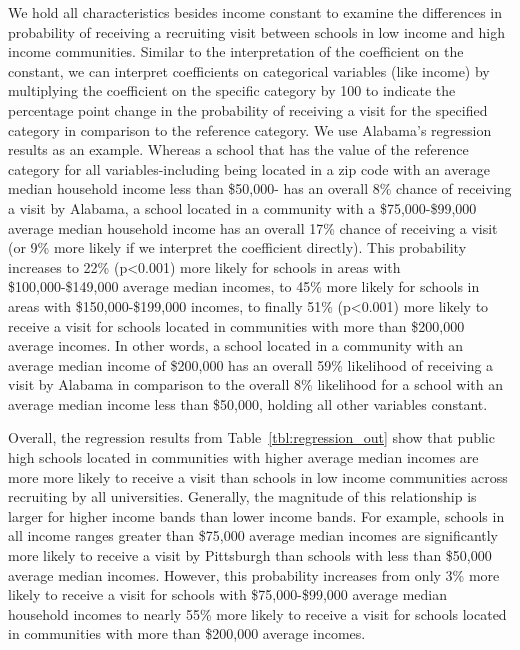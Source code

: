 \documentclass[twoside]{article}
\begin{document}
We hold all characteristics besides income constant to examine the differences in probability of receiving a recruiting visit between schools in low income and high income communities. Similar to the interpretation of the coefficient on the constant, we can interpret coefficients on categorical variables (like income) by multiplying the coefficient on the specific category by 100 to indicate the percentage point change in the probability of receiving a visit for the specified category in comparison to the reference category. We use Alabama's regression results as an example. Whereas a school that has the value of the reference category for all variables-including being located in a zip code with an average median household income less than \$50,000- has an overall 8\% chance of receiving a visit by Alabama, a school located in a community with a \$75,000-\$99,000 average median household income has an overall 17\% chance of receiving a visit (or 9\% more likely if we interpret the coefficient directly).  This probability increases to 22\%  (p<0.001) more likely for schools in areas with \$100,000-\$149,000 average median incomes, to 45\% more likely for schools in areas with \$150,000-\$199,000 incomes, to finally 51\% (p<0.001) more likely to receive a visit for schools located in communities with more than \$200,000 average incomes. In other words, a school located in a community with an average median income of \$200,000 has an overall 59\% likelihood of receiving a visit by Alabama in comparison to the overall 8\% likelihood for a school with an average median income less than \$50,000, holding all other variables constant.

Overall, the regression results from Table~\ref{tbl:regression_out} show that public high schools located in communities with higher average median incomes are more more likely to receive a visit than schools in low income communities across recruiting by all universities. Generally, the magnitude of this relationship is larger for higher income bands than lower income bands. For example, schools in all income ranges greater than \$75,000 average median incomes are significantly more likely to receive a visit by Pittsburgh than schools with less than \$50,000 average median incomes. However, this probability increases from only 3\% more likely to receive a visit for schools with \$75,000-\$99,000 average median household incomes to nearly 55\% more likely to receive a visit for schools located in communities with more than \$200,000 average incomes.
\end{document}
